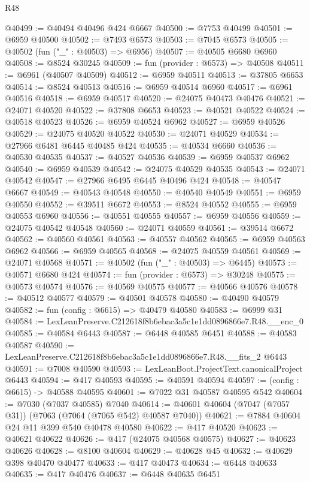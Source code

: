 \begin{lexlean}{R48}
\begin{coremodule}
@40499 := @40494 @40496 @424 @6667
@40500 := @7753 @40499
@40501 := @6959 @40500
@40502 := @7493 @6573
@40503 := @7045 @6573
@40505 := @40502 (fun ("_" : @40503) => @6956)
@40507 := @40505 @6680 @6960
@40508 := @8524 @30245
@40509 := fun (provider : @6573) => @40508
@40511 := @6961 (@40507 @40509)
@40512 := @6959 @40511
@40513 := @37805 @6653
@40514 := @8524 @40513
@40516 := @6959 @40514 @6960
@40517 := @6961 @40516
@40518 := @6959 @40517
@40520 := @24075 @40473 @40476
@40521 := @24071 @40520
@40522 := @37808 @6653
@40523 := @40521 @40522
@40524 := @40518 @40523
@40526 := @6959 @40524 @6962
@40527 := @6959 @40526
@40529 := @24075 @40520 @40522
@40530 := @24071 @40529
@40534 := @27966 @6481 @6445 @40485 @424
@40535 := @40534 @6660
@40536 := @40530 @40535
@40537 := @40527 @40536
@40539 := @6959 @40537 @6962
@40540 := @6959 @40539
@40542 := @24075 @40529 @40535
@40543 := @24071 @40542
@40547 := @27966 @6495 @6445 @40496 @424
@40548 := @40547 @6667
@40549 := @40543 @40548
@40550 := @40540 @40549
@40551 := @6959 @40550
@40552 := @39511 @6672
@40553 := @8524 @40552
@40555 := @6959 @40553 @6960
@40556 := @40551 @40555
@40557 := @6959 @40556
@40559 := @24075 @40542 @40548
@40560 := @24071 @40559
@40561 := @39514 @6672
@40562 := @40560 @40561
@40563 := @40557 @40562
@40565 := @6959 @40563 @6962
@40566 := @6959 @40565
@40568 := @24075 @40559 @40561
@40569 := @24071 @40568
@40571 := @40502 (fun ("_" : @40503) => @6445)
@40573 := @40571 @6680 @424
@40574 := fun (provider : @6573) => @30248
@40575 := @40573 @40574
@40576 := @40569 @40575
@40577 := @40566 @40576
@40578 := @40512 @40577
@40579 := @40501 @40578
@40580 := @40490 @40579
@40582 := fun (config : @6615) => @40479 @40580
@40583 := @6999 @31
@40584 := LexLeanPreserve.C212618f8b6ebac3a5c1e1dd0896866e7.R48.__enc_0
@40585 := @40584 @6443
@40587 := @6448 @40585 @6451
@40588 := @40583 @40587
@40590 := LexLeanPreserve.C212618f8b6ebac3a5c1e1dd0896866e7.R48.__fits_2 @6443
@40591 := @7008 @40590
@40593 := LexLeanBoot.ProjectText.canonicalProject @6443
@40594 := @417 @40593
@40595 := @40591 @40594
@40597 := (config : @6615) -> @40588 @40595
@40601 := @7022 @31 @40587 @40595 @542
@40604 := @7030 (@7037 @40585) @7040
@40614 := @40601 @40604 (@7047 (@7057 @31)) (@7063 (@7064 (@7065 @542) @40587 @7040))
@40621 := @7884 @40604 @24 @11 @399 @540 @40478 @40580
@40622 := @417 @40520
@40623 := @40621 @40622
@40626 := @417 (@24075 @40568 @40575)
@40627 := @40623 @40626
@40628 := @8100 @40604
@40629 := @40628 @45
@40632 := @40629 @398 @40470 @40477
@40633 := @417 @40473
@40634 := @6448 @40633
@40635 := @417 @40476
@40637 := @6448 @40635 @6451

\end{coremodule}
\end{lexlean}

